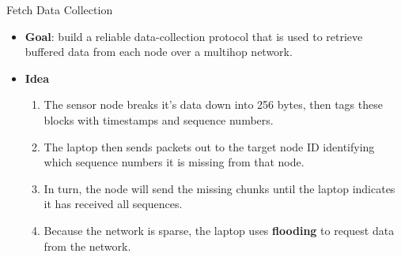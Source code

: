 \begin{frame}[t,fragile]{Fetch Data Collection}
\begin{itemize}[<+->]
\item \textbf{Goal}: build a reliable data-collection protocol that is used to retrieve buffered data from each node over a multihop network.
\item \textbf{Idea}
\begin{enumerate}
\item The sensor node breaks it’s data down into 256 bytes, then
tags these blocks with timestamps and sequence numbers.
\item The laptop then sends packets out to the target node ID
identifying which sequence numbers it is missing from that
node.
\item In turn, the node will send the missing chunks until the laptop
indicates it has received all sequences.
\item Because the network is sparse, the laptop uses \textbf{flooding} to request data from the network.
\end{enumerate}
\end{itemize}
\end{frame}

